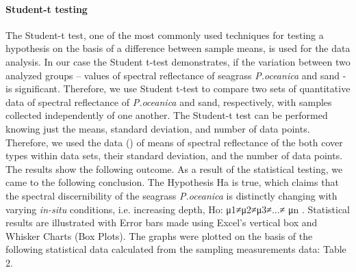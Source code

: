 \documentclass[11pt]{article}
\begin{document}
\paragraph{Student-t testing}
The Student-t test, one of the most commonly used techniques for testing a hypothesis on the basis
of a difference between sample means, is used for the data analysis. In our case the Student t-test demonstrates, if the variation
between two analyzed groups – values of spectral reflectance of seagrass \textit{P.oceanica} and sand - is
significant. Therefore, we use Student t-test to compare two sets of quantitative data of spectral
reflectance of \textit{P.oceanica} and sand, respectively, with samples collected independently of one
another. The Student-t test can be performed knowing just the means, standard deviation, and number
of data points. Therefore, we used the data () of means of spectral reflectance of the both
 cover types within data sets, their standard deviation, and the number of data points.
The results show the following outcome.
As a result of the statistical testing, we came to the following conclusion.
The Hypothesis Ha is true, which claims that the spectral discernibility of the seagrass 	\textit{P.oceanica} is
distinctly changing with varying \textit{in-situ} conditions, i.e. increasing depth, Ho: μ1≠μ2≠μ3≠...≠ μn .
Statistical results are illustrated with Error bars made using Excel's vertical box and Whisker Charts
(Box Plots).
The graphs were plotted on the basis of the following statistical data calculated from the sampling
measurements data: Table 2.
\end{document}
